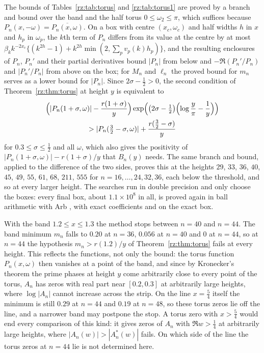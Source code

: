 \begin{remark}\label{rz:rem:torus}
The bounds of Tables~\ref{rz:tab:torus} and \ref{rz:tab:torus1} are proved by a branch and bound over the band and the half torus $0\le\omega_2\le\pi$, which suffices because $P_n(x,-\omega)=\overline{P_n(x,\omega)}$. On a box with centre $(x_c,\omega_c)$ and half widths $h$ in $x$ and $h_p$ in $\omega_p$, the $k$th term of $P_n$ differs from its value at the centre by at most $\beta_kk^{-2x_c}\{(k^{2h}-1)+k^{2h}\min(2,\sum_pv_p(k)h_p)\}$, and the resulting enclosures of $P_n$, $P_n'$ and their partial derivatives bound $|P_n|$ from below and $-\Re(P_n'/P_n)$ and $|P_n'/P_n|$ from above on the box; for $M_n$ and $\ell_n$ the proved bound for $m_n$ serves as a lower bound for $|P_n|$. Since $2\sigma-\frac12>0$, the second condition of Theorem~\ref{rz:thm:torus} at height $y$ is equivalent to
\begin{multline*}
\Bigl(|P_n(1+\sigma,\omega)|-\frac{r(1+\sigma)}y\Bigr)\exp\Bigl(\bigl(2\sigma-\tfrac12\bigr)\Bigl(\log\frac y\pi-\frac1y\Bigr)\Bigr)\\
>|P_n(\tfrac32-\sigma,\omega)|+\frac{r(\frac32-\sigma)}y
\end{multline*}
for $0.3\le\sigma\le\frac12$ and all $\omega$, which also gives the positivity of $|P_n(1+\sigma,\omega)|-r(1+\sigma)/y$ that $B_n(y)$ needs. The same branch and bound, applied to the difference of the two sides, proves this at the heights $29$, $33$, $36$, $40$, $45$, $49$, $55$, $61$, $68$, $211$, $555$ for $n=16,\dots,24,32,36$, each below the threshold, and so at every larger height. The searches run in double precision and only choose the boxes: every final box, about $1.1\times10^8$ in all, is proved again in ball arithmetic with Arb \cite{Arb}, with exact coefficients and on the exact box.
\end{remark}

With the band $1.2\le x\le1.3$ the method stops between $n=40$ and $n=44$. The band minimum $m_n$ falls to $0.20$ at $n=36$, $0.056$ at $n=40$ and $0$ at $n=44$, so at $n=44$ the hypothesis $m_n>r(1.2)/y$ of Theorem~\ref{rz:thm:torus} fails at every height. This reflects the functions, not only the bound: the torus function $P_n(x,\omega)$ then vanishes at a point of the band, and since by Kronecker's theorem the prime phases at height $y$ come arbitrarily close to every point of the torus, $A_n$ has zeros with real part near $[0.2,0.3]$ at arbitrarily large heights, where $\log|A_n|$ cannot increase across the strip. On the line $x=\frac54$ itself the minimum is still $0.29$ at $n=44$ and $0.19$ at $n=48$, so these torus zeros lie off the line, and a narrower band may postpone the stop. A torus zero with $x>\frac54$ would end every comparison of this kind: it gives zeros of $A_n$ with $\Re w>\frac14$ at arbitrarily large heights, where $|A_n(w)|>|A_n^*(w)|$ fails. On which side of the line the torus zeros at $n=44$ lie is not determined here.

